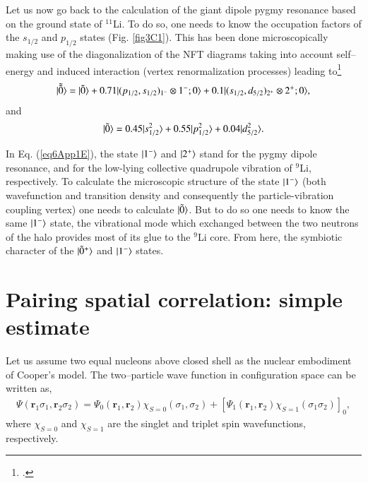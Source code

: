 \begin{subappendices}
Let us now go back to the calculation of the giant dipole pygmy resonance based on the ground state of $^{11}$Li. To do so, one needs to know the occupation factors of the $s_{1/2}$ and $p_{1/2}$ states (Fig. \ref{fig3C1}). This has been done microscopically making use of the diagonalization of the NFT diagrams taking into account self--energy and induced interaction (vertex renormalization processes) leading to\footnote{\cite{Barranco:01}.}
\begin{align}\label{eq6App1E}
|{\tilde {\tilde 0}} \rangle=|{\tilde 0} \rangle+0.71|{(p_{1/2},s_{1/2})_{1^-}\otimes1^-;0} \rangle+0.1|{(s_{1/2},d_{5/2})_{2^+}\otimes2^+;0} \rangle,
\end{align}
and 
\begin{align}\label{eq7App1E}
|{\tilde 0} \rangle=0.45|{s_{1/2}^2} \rangle+0.55|{p_{1/2}^2} \rangle+0.04|{d_{5/2}^2} \rangle.
\end{align}

In Eq. (\ref{eq6App1E}), the state $|{1^-} \rangle$ and $|{2^+} \rangle$ stand for the  pygmy dipole resonance, and for the low-lying collective quadrupole vibration of $^9$Li, respectively.  To calculate the microscopic structure of the state $|{1^-} \rangle$ (both wavefunction and transition density and consequently the particle-vibration coupling vertex) one needs to calculate $|{\tilde 0} \rangle$. But to do so one needs to know the same $|{1^-} \rangle$ state, the vibrational mode which exchanged between the two neutrons of the halo provides most of its glue to the $^9$Li core. From here, the symbiotic character of the $|{\tilde 0^+} \rangle$ and $|{1^-} \rangle$ states. 
 
\section{Pairing spatial correlation: simple estimate}\label{app3D}
Let us assume two equal nucleons above closed shell as the nuclear embodiment of Cooper's model. The two--particle wave function in configuration space can be written as,
\begin{align}\label{eq1App3E}
\Psi(\mathbf r_1\sigma_1,\mathbf r_2\sigma_2)=\Psi_0(\mathbf r_1,\mathbf r_2)\chi_{S=0}(\sigma_1,\sigma_2)+\left[\Psi_1(\mathbf r_1,\mathbf r_2)\chi_{S=1}(\sigma_1\sigma_2)\right]_0,
\end{align}
where $\chi_{S=0}$ and $\chi_{S=1}$ are the singlet and triplet spin wavefunctions, respectively.


\end{subappendices}
